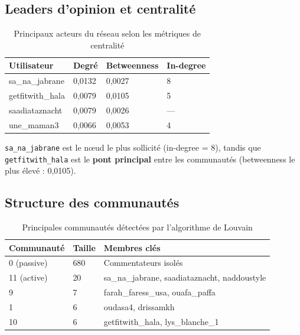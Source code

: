 \documentclass[12pt, a4paper]{article}
\begin{document}
\subsection{Leaders d'opinion et centralité}

\begin{table}[h!]
\centering
\begin{tabular}{@{}llll@{}}
\toprule
\textbf{Utilisateur} & \textbf{Degré} & \textbf{Betweenness} & \textbf{In-degree} \\
\midrule
sa\_na\_jabrane    & 0,0132 & 0,0027 & 8 \\
getfitwith\_hala   & 0,0079 & 0,0105 & 5 \\
saadiataznacht     & 0,0079 & 0,0026 & — \\
une\_maman3        & 0,0066 & 0,0053 & 4 \\
\bottomrule
\end{tabular}
\caption{Principaux acteurs du réseau selon les métriques de centralité}
\end{table}

\texttt{sa\_na\_jabrane} est le nœud le plus sollicité (in-degree = 8),
tandis que \texttt{getfitwith\_hala} est le \textbf{pont principal} entre les
communautés (betweenness le plus élevé : 0,0105).

\subsection{Structure des communautés}

\begin{table}[h!]
\centering
\begin{tabular}{@{}lll@{}}
\toprule
\textbf{Communauté} & \textbf{Taille} & \textbf{Membres clés} \\
\midrule
0 (passive)  & 680 & Commentateurs isolés \\
11 (active)  & 20  & sa\_na\_jabrane, saadiataznacht, naddoustyle \\
9            & 7   & farah\_faress\_usa, ouafa\_paffa \\
1            & 6   & oudasa4, drissamkh \\
10           & 6   & getfitwith\_hala, lys\_blanche\_1 \\
\bottomrule
\end{tabular}
\caption{Principales communautés détectées par l'algorithme de Louvain}
\end{table}

\end{document}
